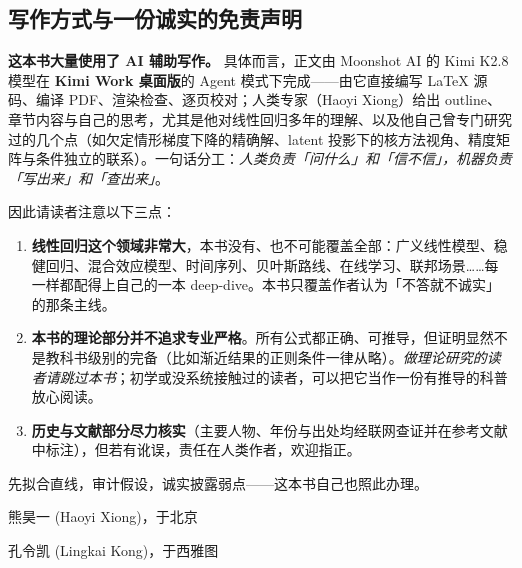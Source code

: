 \subsection*{写作方式与一份诚实的免责声明}

\textbf{这本书大量使用了 AI 辅助写作。} 具体而言，正文由 Moonshot AI 的 Kimi K2.8 模型在 \textbf{Kimi Work 桌面版}的 Agent 模式下完成——由它直接编写 LaTeX 源码、编译 PDF、渲染检查、逐页校对；人类专家（Haoyi Xiong）给出 outline、章节内容与自己的思考，尤其是他对线性回归多年的理解、以及他自己曾专门研究过的几个点（如欠定情形梯度下降的精确解、latent 投影下的核方法视角、精度矩阵与条件独立的联系）。一句话分工：\textit{人类负责「问什么」和「信不信」，机器负责「写出来」和「查出来」}。

因此请读者注意以下三点：

\begin{enumerate}[label=(\alph*)]
  \item \textbf{线性回归这个领域非常大}，本书没有、也不可能覆盖全部：广义线性模型、稳健回归、混合效应模型、时间序列、贝叶斯路线、在线学习、联邦场景……每一样都配得上自己的一本 deep-dive。本书只覆盖作者认为「不答就不诚实」的那条主线。
  \item \textbf{本书的理论部分并不追求专业严格}。所有公式都正确、可推导，但证明显然不是教科书级别的完备（比如渐近结果的正则条件一律从略）。\textit{做理论研究的读者请跳过本书}；初学或没系统接触过的读者，可以把它当作一份有推导的科普放心阅读。
  \item \textbf{历史与文献部分尽力核实}（主要人物、年份与出处均经联网查证并在参考文献中标注），但若有讹误，责任在人类作者，欢迎指正。
\end{enumerate}

先拟合直线，审计假设，诚实披露弱点——这本书自己也照此办理。

\vspace{1em}
\hfill 熊昊一 (Haoyi Xiong)，于北京

\hfill 孔令凯 (Lingkai Kong)，于西雅图
